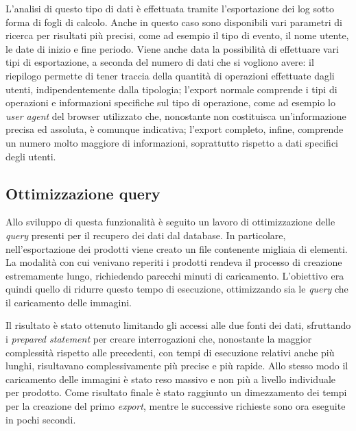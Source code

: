 L'analisi di questo tipo di dati è effettuata tramite l'esportazione dei log sotto forma di fogli di calcolo. Anche in questo caso sono disponibili vari parametri di ricerca per risultati più precisi, come ad esempio il tipo di evento, il nome utente, le date di inizio e fine periodo. Viene anche data la possibilità di effettuare vari tipi di esportazione, a seconda del numero di dati che si vogliono avere: il riepilogo permette di tener traccia della quantità di operazioni effettuate dagli utenti, indipendentemente dalla tipologia; l'export normale comprende i tipi di operazioni e informazioni specifiche sul tipo di operazione, come ad esempio lo \textit{user agent} del browser utilizzato che, nonostante non costituisca un'informazione precisa ed assoluta, è comunque indicativa; l'export completo, infine, comprende un numero molto maggiore di informazioni, soprattutto rispetto a dati specifici degli utenti.

\subsection{Ottimizzazione query}
Allo sviluppo di questa funzionalità è seguito un lavoro di ottimizzazione delle \textit{query} presenti per il recupero dei dati dal database. In particolare, nell'esportazione dei prodotti viene creato un file contenente migliaia di elementi. La modalità con cui venivano reperiti i prodotti rendeva il processo di creazione estremamente lungo, richiedendo parecchi minuti di caricamento. L'obiettivo era quindi quello di ridurre questo tempo di esecuzione, ottimizzando sia le \textit{query} che il caricamento delle immagini. 

Il risultato è stato ottenuto limitando gli accessi alle due fonti dei dati, sfruttando i \textit{prepared statement} per creare interrogazioni che, nonostante la maggior complessità rispetto alle precedenti, con tempi di esecuzione relativi anche più lunghi, risultavano complessivamente più precise e più rapide. Allo stesso modo il caricamento delle immagini è stato reso massivo e non più a livello individuale per prodotto. Come risultato finale è stato raggiunto un dimezzamento dei tempi per la creazione del primo \textit{export}, mentre le successive richieste sono ora eseguite in pochi secondi.

